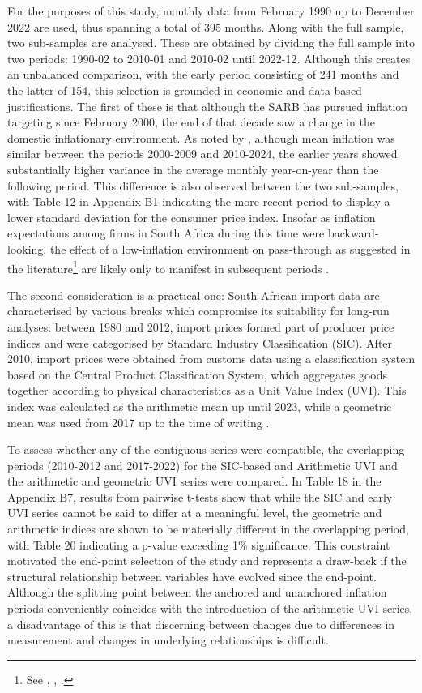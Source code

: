 \documentclass[12pt]{article}
\begin{document}
For the purposes of this study, monthly data from February 1990 up to December 2022 are used, thus spanning a total of 395 months. Along with the full sample, two sub-samples are analysed. These are obtained by dividing the full sample into two periods: 1990-02 to 2010-01 and 2010-02 until 2022-12. Although this creates an unbalanced comparison, with the early period consisting of 241 months and the latter of 154, this selection is grounded in economic and data-based justifications. The first of these is that although the SARB has pursued inflation targeting since February 2000, the end of that decade saw a change in the domestic inflationary environment. As noted by \textcite{Burger2025}, although mean inflation was similar between the periods 2000-2009 and 2010-2024, the earlier years showed substantially higher variance in the average monthly year-on-year than the following period. This difference is also observed between the two sub-samples, with Table 12 in Appendix B1 indicating the more recent period to display a lower standard deviation for the consumer price index. Insofar as inflation expectations among firms in South Africa during this time were backward-looking, the effect of a low-inflation environment on pass-through as suggested in the literature\footnote{See \textcite{taylor2000low}, \textcite{gagnon2004monetary}, \textcite{ozkan2015time}.} are likely only to manifest in subsequent periods \parencite{kabundischaling, Burger2025}. 

The second consideration is a practical one: South African import data are characterised by various breaks which compromise its suitability for long-run analyses: between 1980 and 2012, import prices formed part of producer price indices and were categorised by Standard Industry Classification (SIC). After 2010, import prices were obtained from customs data using a classification system based on the Central Product Classification System, which aggregates goods together according to physical characteristics as a Unit Value Index (UVI). This index was calculated as the arithmetic mean up until 2023, while a geometric mean was used from 2017 up to the time of writing \cite{StatsSA2025XUVI}.

 To assess whether any of the contiguous series were compatible, the overlapping periods (2010-2012 and 2017-2022) for the SIC-based and Arithmetic UVI and the arithmetic and geometric UVI series were compared. In Table 18 in the Appendix B7, results from pairwise t-tests show that while the SIC and early UVI series cannot be said to differ at a meaningful level, the geometric and arithmetic indices are shown to be materially different in the overlapping period, with Table 20 indicating a p-value exceeding 1\% significance. This constraint motivated the end-point selection of the study and represents a draw-back if the structural relationship between variables have evolved since the end-point. Although the splitting point between the anchored and unanchored inflation periods conveniently coincides with the introduction of the arithmetic UVI series, a disadvantage of this is that discerning between changes due to differences in measurement and changes in underlying relationships is difficult.
 
\end{document}
